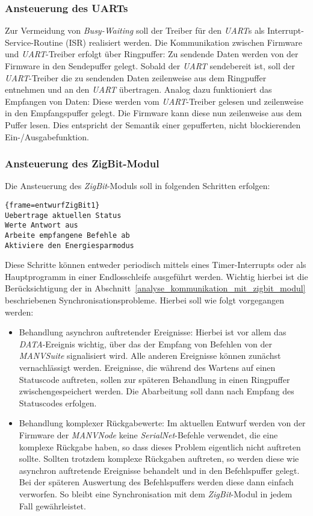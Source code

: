 \subsubsection{Ansteuerung des UARTs}
Zur Vermeidung von \emph{Busy-Waiting} soll der Treiber für den \emph{UART}s als Interrupt-Service-Routine (ISR)
realisiert werden. Die Kommunikation zwischen Firmware und \emph{UART}-Treiber erfolgt über Ringpuffer:
Zu sendende Daten werden von der Firmware in den Sendepuffer gelegt. Sobald der \emph{UART} sendebereit ist, 
soll der \emph{UART}-Treiber die zu sendenden Daten zeilenweise aus dem Ringpuffer entnehmen und an
den \emph{UART} übertragen. Analog dazu funktioniert das Empfangen von Daten: Diese werden vom \emph{UART}-Treiber gelesen
und zeilenweise in den Empfangspuffer gelegt. Die Firmware kann diese nun zeilenweise aus dem Puffer lesen.
Dies entspricht der Semantik einer gepufferten, nicht blockierenden Ein-/Ausgabefunktion.

\subsubsection{Ansteuerung des ZigBit-Modul}
Die Ansteuerung des \emph{ZigBit}-Moduls soll in folgenden Schritten erfolgen: 

\begin{lstlisting}{frame=entwurfZigBit1}
Uebertrage aktuellen Status
Werte Antwort aus
Arbeite empfangene Befehle ab
Aktiviere den Energiesparmodus
\end{lstlisting}

Diese Schritte können entweder periodisch mittels eines Timer-Interrupts oder als Hauptprogramm in einer Endlosschleife
ausgeführt werden. Wichtig hierbei ist die Berücksichtigung der in Abschnitt~\ref{analyse_kommunikation_mit_zigbit_modul}
beschriebenen Synchronisationsprobleme. Hierbei soll wie folgt vorgegangen werden:

\begin{itemize}
    \item{Behandlung asynchron auftretender Ereignisse:} Hierbei ist vor allem das \emph{DATA}-Ereignis wichtig, über das
    der Empfang von Befehlen von der \emph{MANVSuite} signalisiert wird. Alle anderen Ereignisse können zunächst vernachlässigt
    werden. Ereignisse, die während des Wartens auf einen Statuscode auftreten, sollen zur späteren Behandlung in einen
    Ringpuffer zwischengespeichert werden. Die Abarbeitung soll dann nach Empfang des Statuscodes erfolgen.

    \item{Behandlung komplexer Rückgabewerte:} Im aktuellen Entwurf werden von der Firmware der \emph{MANVNode} keine 
    \emph{SerialNet}-Befehle verwendet, die eine komplexe Rückgabe haben, so dass dieses Problem eigentlich nicht auftreten 
    sollte. Sollten trotzdem komplexe Rückgaben auftreten, so werden diese wie asynchron auftretende Ereignisse behandelt
    und in den Befehlspuffer gelegt. Bei der späteren Auswertung des Befehlspuffers werden diese dann einfach verworfen.
    So bleibt eine Synchronisation mit dem \emph{ZigBit}-Modul in jedem Fall gewährleistet.
\end{itemize}


